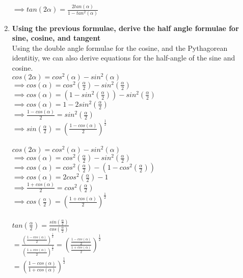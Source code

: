\begin{enumerate}
\tab$\implies tan(2\alpha) = \frac{2tan(\alpha)}{1 - tan^2(\alpha)}$\\

\item{\bf Using the previous formulae, derive the half angle formulae for sine, cosine, and tangent}\\

Using the double angle formulae for the cosine, and the Pythagorean identitiy, we can also derive equations for the half-angle of the sine and cosine.\\

\tab$cos(2\alpha) = cos^2(\alpha) - sin^2(\alpha)$\\

\tab$\implies cos(\alpha) = cos^2(\frac{\alpha}{2}) - sin^2(\frac{\alpha}{2})$\\

\tab$\implies cos(\alpha) = (1 - sin^2(\frac{\alpha}{2})) - sin^2(\frac{\alpha}{2})$\\

\tab$\implies cos(\alpha) = 1- 2sin^2(\frac{\alpha}{2})$\\

\tab$\implies \frac{1 - cos(\alpha)}{2} = sin^2(\frac{\alpha}{2})$\\

\tab$\implies sin(\frac{\alpha}{2}) = (\frac{1 - cos(\alpha)}{2})^{\frac{1}{2}}$\\ \\



\tab$cos(2\alpha) = cos^2(\alpha) - sin^2(\alpha)$\\

\tab$\implies cos(\alpha) = cos^2(\frac{\alpha}{2}) - sin^2(\frac{\alpha}{2})$\\

\tab$\implies cos(\alpha) = cos^2(\frac{\alpha}{2}) - (1 - cos^2(\frac{\alpha}{2}))$\\

\tab$\implies cos(\alpha) = 2cos^2(\frac{\alpha}{2}) -  1$\\

\tab$\implies \frac{1 + cos(\alpha)}{2} = cos^2(\frac{\alpha}{2})$\\

\tab$\implies cos(\frac{\alpha}{2}) = (\frac{1 + cos(\alpha)}{2})^{\frac{1}{2}}$\\ \\


\tab$tan(\frac{\alpha}{2}) = \frac{sin(\frac{\alpha}{2})}{cos(\frac{\alpha}{2})}$\\

\tab$ = \frac{ (\frac{1 - cos(\alpha)}{2})^{\frac{1}{2}}}{ (\frac{1 + cos(\alpha)}{2})^{\frac{1}{2}}} = (\frac{\frac{1 - cos(\alpha)}{2}}{\frac{1 + cos(\alpha)}{2}})^{\frac{1}{2}}$\\

\tab$ = (\frac{1 - cos(\alpha)}{1 + cos(\alpha)})^{\frac{1}{2}}$\\

\end{enumerate}






